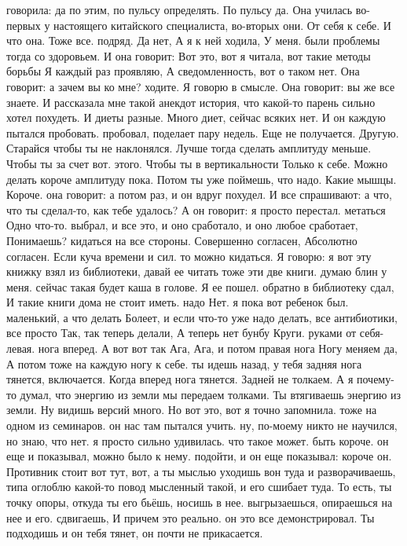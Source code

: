 говорила: да по этим, по пульсу определять.
По пульсу да.
Она училась во-первых у настоящего китайского специалиста, во-вторых они.
От себя к себе.
И что она.
Тоже все.
подряд. Да нет, А я к ней ходила, У меня.
были проблемы тогда со здоровьем. И она говорит: Вот это, вот я читала, вот такие методы борьбы Я каждый раз проявляю, А сведомленность, вот о таком нет.
Она говорит: а зачем вы ко мне?
ходите.
Я говорю в смысле.
Она говорит: вы же все знаете.
И рассказала мне такой анекдот история, что какой-то парень сильно хотел похудеть.
И диеты разные.
Много диет, сейчас всяких нет.
И он каждую пытался пробовать. пробовал, поделает пару недель.
Еще не получается.
Другую.
Старайся чтобы ты не наклонялся.
Лучше тогда сделать амплитуду меньше.
Чтобы ты за счет вот.
этого.
Чтобы ты в вертикальности
Только к себе.
Можно делать короче амплитуду пока.
Потом ты уже поймешь, что надо.
Какие мышцы.
Короче. она говорит: а потом раз, и он вдруг похудел.
И все спрашивают: а что, что ты сделал-то, как тебе удалось?
А он говорит: я просто перестал.
метаться Одно что-то.
выбрал, и все это, и оно сработало, и оно любое сработает, Понимаешь?
кидаться на все стороны. Совершенно согласен, Абсолютно согласен.
Если куча времени и сил.
то можно кидаться. Я говорю: я вот эту книжку взял из библиотеки, давай ее читать тоже эти две книги. думаю блин у меня.
сейчас такая будет каша в голове. Я ее пошел.
обратно в библиотеку сдал, И такие книги дома не стоит иметь. надо Нет.
я пока вот ребенок был.
маленький, а что делать Болеет, и если что-то уже надо делать,
все антибиотики, все просто Так, так теперь делали, А теперь нет бунбу Круги.
руками от себя- левая.
нога вперед. А вот вот так Ага, Ага, и потом правая нога Ногу меняем да, А потом тоже на каждую ногу к себе.
ты идешь назад, у тебя задняя нога тянется, включается.
Когда вперед нога тянется.
Задней не толкаем.
А я почему-то думал, что энергию из земли мы передаем толками.
Ты втягиваешь энергию из земли.
Ну видишь версий много.
Но вот это, вот я точно запомнила.
тоже на одном из семинаров. он нас там пытался учить. ну, по-моему никто не научился, но знаю, что нет. я просто сильно удивилась.
что такое может.
быть короче. он еще и показывал, можно было к нему.
подойти, и он еще показывал: короче он.
Противник стоит вот тут, вот, а ты мыслью уходишь вон туда и разворачиваешь, типа оглоблю какой-то повод мысленный такой, и его сшибает туда. То есть, ты точку опоры, откуда ты его бьёшь, носишь в нее.
выгрызаешься, опираешься на нее и его.
сдвигаешь, И причем это реально. он это все демонстрировал. Ты подходишь и он тебя тянет, он почти не прикасается.
